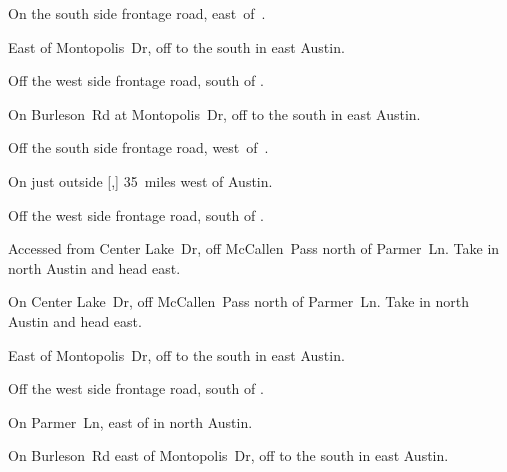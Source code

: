 
\begin{LocationList}

On the south side  frontage road, east~of~.

East of Montopolis~Dr, off  to the south in east Austin.

\Location{\GarageHQ \Garage}
Off the west side  frontage road, south of .

\Location{\GasStation \Gas \Rest}
On Burleson~Rd at Montopolis~Dr, off  to the south in east Austin.

Off the south side  frontage road, west~of~.

On  just outside [,] 35~miles west of Austin.

Off the west side  frontage road, south of .

Accessed from Center Lake~Dr, off McCallen~Pass north of  Parmer~Ln.
Take   in north Austin and head east.

On Center Lake~Dr, off McCallen~Pass north of  Parmer~Ln.
Take   in north Austin and head east.

East of Montopolis~Dr, off  to the south in east Austin.

Off the west side  frontage road, south of .

On  Parmer~Ln, east of   in north Austin.

On Burleson~Rd east of Montopolis~Dr, off  to the south in east Austin.

\end{LocationList}
